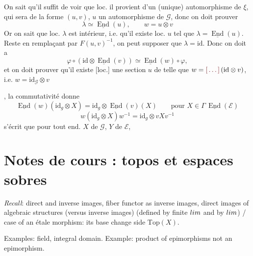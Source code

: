 \documentclass[11pt,a4paper]{article}
\begin{document}
On sait qu'il suffit de voir que loc. il provient d'un (unique) automorphisme de
$\xi$, qui sera de la forme $(u,v)$, $u$ un automorphisme de $\mathcal{G}$, donc
on doit prouver
\[
\lambda \simeq \underline{\operatorname{End}}(u), \qquad w = u \otimes v
\]
Or on sait que loc. $\lambda$ est \struck{\ill{}} intérieur, i.e. qu'il existe
loc. $u$ tel que $\lambda = \underline{\operatorname{End}}(u)$. Reste \ill{} en
remplaçant \ill{} par $F(u,v)^{-1}$, on peut supposer que $\lambda = \mathrm{id}$.
Donc on doit a
\[
\varphi \circ (\mathrm{id} \otimes \underline{\operatorname{End}}(v)) \simeq
\underline{\operatorname{End}}(w) \circ \varphi,
\]
et on doit prouver qu'il existe [loc.] une section $u$ de \ill{} telle que
$w = \ill{}\,(\mathrm{id} \otimes v)$, i.e.
$w = \mathrm{id}_{\mathcal{G}} \otimes v$ \ill{}

, la commutativité
 donne
\[
\underline{\operatorname{End}}(w)(\mathrm{id}_{g} \otimes X) =
\mathrm{id}_{g} \otimes \underline{\operatorname{End}}(v)(X) \qquad
\text{pour } X \in \Gamma\,\underline{\operatorname{End}}(\mathcal{E})
\]
\[
w(\mathrm{id}_{g} \otimes X)w^{-1} = \mathrm{id}_{g} \otimes vXv^{-1}
\]
\ill{} s'écrit que pour tout end. $X$ de $\mathcal{G}$, $Y$ de $\mathcal{E}$,
\ill{}

\section*{Notes de cours : topos et espaces sobres}

\emph{Recall}: direct and inverse images, fiber functor as inverse images, direct
images of  algebraic structures (versus inverse images)
(defined by finite $\varprojlim$ and by $\varinjlim$) / case of an étale
morphism: its base change \ill{} side $\mathrm{Top}(X)$.

Examples: field, integral domain. Example: product of epimorphisms not an
epimorphism.

\end{document}
